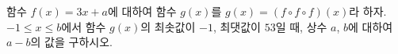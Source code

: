 함수 $f(x)=3x+a$에 대하여 함수 $g(x)$를 $g(x)=(f\circ f\circ f)(x)$라 하자. $-1\le x\le b$에서 함수 $g(x)$의 최솟값이 $-1$, 최댓값이 $53$일 때, 상수 $a$, $b$에 대하여 $a-b$의 값을 구하시오.
